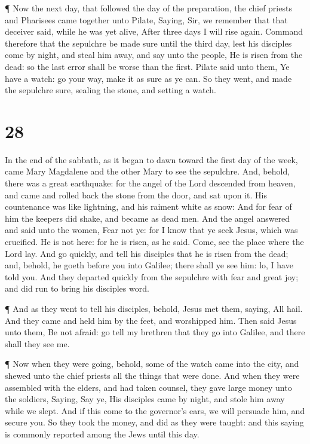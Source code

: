  ¶ Now the next day, that followed the day of the
preparation, the chief priests and Pharisees came together unto Pilate,
 Saying, Sir, we remember that that deceiver said, while he
was yet alive, After three days I will rise again.  Command
therefore that the sepulchre be made sure until the third day, lest his
disciples come by night, and steal him away, and say unto the people, He
is risen from the dead: so the last error shall be worse than the first.
 Pilate said unto them, Ye have a watch: go your way, make
it as sure as ye can.  So they went, and made the sepulchre
sure, sealing the stone, and setting a watch.

\hypertarget{section-27}{%
\section{28}\label{section-27}}

 In the end of the sabbath, as it began to dawn toward the
first day of the week, came Mary Magdalene and the other Mary to see the
sepulchre.  And, behold, there was a great earthquake: for
the angel of the Lord descended from heaven, and came and rolled back
the stone from the door, and sat upon it.  His countenance
was like lightning, and his raiment white as snow:  And for
fear of him the keepers did shake, and became as dead men. 
And the angel answered and said unto the women, Fear not ye: for I know
that ye seek Jesus, which was crucified.  He is not here:
for he is risen, as he said. Come, see the place where the Lord lay.
 And go quickly, and tell his disciples that he is risen
from the dead; and, behold, he goeth before you into Galilee; there
shall ye see him: lo, I have told you.  And they departed
quickly from the sepulchre with fear and great joy; and did run to bring
his disciples word.

 ¶ And as they went to tell his disciples, behold, Jesus met
them, saying, All hail. And they came and held him by the feet, and
worshipped him.  Then said Jesus unto them, Be not afraid:
go tell my brethren that they go into Galilee, and there shall they see
me.

 ¶ Now when they were going, behold, some of the watch came
into the city, and shewed unto the chief priests all the things that
were done.  And when they were assembled with the elders,
and had taken counsel, they gave large money unto the soldiers,
 Saying, Say ye, His disciples came by night, and stole him
away while we slept.  And if this come to the governor's
ears, we will persuade him, and secure you.  So they took
the money, and did as they were taught: and this saying is commonly
reported among the Jews until this day.

